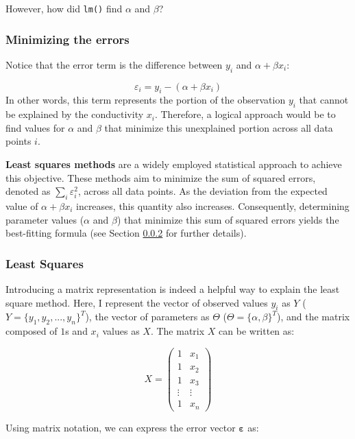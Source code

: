 \documentclass[
]{article}
\begin{document}
However, how did \texttt{lm()} find \(\alpha\) and \(\beta\)?

\hypertarget{minimizing-the-errors}{%
\subsubsection{Minimizing the errors}\label{minimizing-the-errors}}

Notice that the error term is the difference between \(y_i\) and \(\alpha + \beta x_i\):

\[
\varepsilon_i = y_i - (\alpha + \beta x_i)
\]In other words, this term represents the portion of the observation \(y_i\) that cannot be explained by the conductivity \(x_i\). Therefore, a logical approach would be to find values for \(\alpha\) and \(\beta\) that minimize this unexplained portion across all data points \(i\).

\textbf{Least squares methods} are a widely employed statistical approach to achieve this objective. These methods aim to minimize the sum of squared errors, denoted as \(\sum_i \varepsilon_i^2\), across all data points. As the deviation from the expected value of \(\alpha + \beta x_i\) increases, this quantity also increases. Consequently, determining parameter values (\(\alpha\) and \(\beta\)) that minimize this sum of squared errors yields the best-fitting formula (see Section \ref{least-squares} for further details).

\hypertarget{least-squares}{%
\subsubsection{Least Squares}\label{least-squares}}

Introducing a matrix representation is indeed a helpful way to explain the least square method. Here, I represent the vector of observed values \(y_i\) as \(Y\) (\(Y = \{y_1, y_2,...,y_n\}^T\)), the vector of parameters as \(\Theta\) (\(\Theta = \{\alpha, \beta\}^T\)), and the matrix composed of \(1\)s and \(x_i\) values as \(X\). The matrix \(X\) can be written as:

\[
X =
\begin{pmatrix} 
  1 & x_1\\ 
  1 & x_2\\
  1 & x_3\\
  \vdots & \vdots\\
  1 & x_n
\end{pmatrix}
\]

Using matrix notation, we can express the error vector \(\pmb{\varepsilon}\) as:
\end{document}
